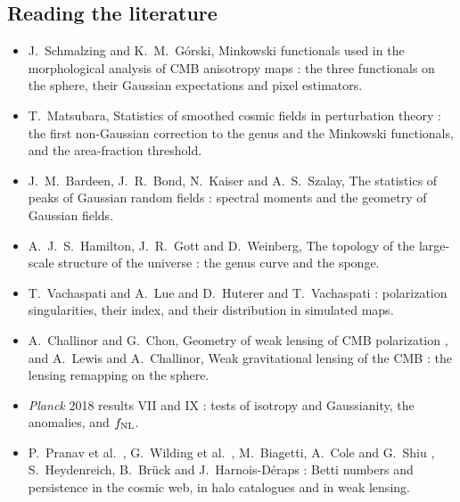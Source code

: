 \subsection*{Reading the literature}
\label{T3a:sec:reading}

\begin{itemize}[itemsep=2pt,leftmargin=1.2em]
  \item J.~Schmalzing and K.~M.~G\'orski, Minkowski functionals used in the morphological analysis of CMB anisotropy maps \cite{SchmalzingGorski1998}: the three functionals on the sphere, their Gaussian expectations and pixel estimators.
  \item T.~Matsubara, Statistics of smoothed cosmic fields in perturbation theory \cite{Matsubara2003}: the first non-Gaussian correction to the genus and the Minkowski functionals, and the area-fraction threshold.
  \item J.~M.~Bardeen, J.~R.~Bond, N.~Kaiser and A.~S.~Szalay, The statistics of peaks of Gaussian random fields \cite{BBKS1986}: spectral moments and the geometry of Gaussian fields.
  \item A.~J.~S.~Hamilton, J.~R.~Gott and D.~Weinberg, The topology of the large-scale structure of the universe \cite{HamiltonGottWeinberg1986}: the genus curve and the sponge.
  \item T.~Vachaspati and A.~Lue \cite{VachaspatiLue2003} and D.~Huterer and T.~Vachaspati \cite{HutererVachaspati2005}: polarization singularities, their index, and their distribution in simulated maps.
  \item A.~Challinor and G.~Chon, Geometry of weak lensing of CMB polarization \cite{ChallinorChon2002}, and A.~Lewis and A.~Challinor, Weak gravitational lensing of the CMB \cite{LewisChallinor2006}: the lensing remapping on the sphere.
  \item \textit{Planck} 2018 results VII and IX \cite{Planck2018VII,Planck2018IX}: tests of isotropy and Gaussianity, the anomalies, and $f_{\rm NL}$.
  \item P.~Pranav et al.\ \cite{Pranav2017}, G.~Wilding et al.\ \cite{Wilding2021}, M.~Biagetti, A.~Cole and G.~Shiu \cite{Biagetti2021}, S.~Heydenreich, B.~Br\"uck and J.~Harnois-D\'eraps \cite{Heydenreich2021}: Betti numbers and persistence in the cosmic web, in halo catalogues and in weak lensing.
\end{itemize}

